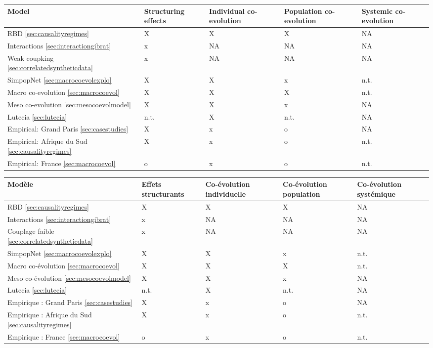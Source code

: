 \begin{table}
{\begin{tabular}[6pt]{|p{4cm}|p{2.5cm}|p{2.5cm}|p{2.5cm}|p{2.5cm}|}
\hline
Model & Structuring effects & Individual co-evolution & Population co-evolution & Systemic co-evolution \\\hline
RBD \ref{sec:causalityregimes} & X & X & X & NA \\\hline
Interactions \ref{sec:interactiongibrat} & x & NA & NA & NA \\\hline
Weak coupking \ref{sec:correlatedsyntheticdata} & x & NA & NA & NA \\\hline
SimpopNet \ref{sec:macrocoevolexplo} & X & X & x & n.t. \\\hline
Macro co-evolution \ref{sec:macrocoevol} & X & X & X & n.t. \\\hline
Meso co-evolution \ref{sec:mesocoevolmodel} & X & X & x & NA\\\hline
Lutecia \ref{sec:lutecia} & n.t. & X & n.t. & NA\\\hline
Empirical: Grand Paris \ref{sec:casestudies} & X & x & o & NA\\\hline
Empirical: Afrique du Sud \ref{sec:causalityregimes} & X & x & o & n.t.\\\hline
Empirical: France \ref{sec:macrocoevol} & o & x & o & n.t.\\\hline
\end{tabular}
}{
\begin{tabular}[6pt]{|p{4cm}|p{2.5cm}|p{2.5cm}|p{2.5cm}|p{2.5cm}|}
\hline
Modèle & Effets structurants & Co-évolution individuelle &  Co-évolution population & Co-évolution systémique \\\hline
RBD \ref{sec:causalityregimes} & X & X & X & NA \\\hline
Interactions \ref{sec:interactiongibrat} & x & NA & NA & NA \\\hline
Couplage faible \ref{sec:correlatedsyntheticdata} & x & NA & NA & NA \\\hline
SimpopNet \ref{sec:macrocoevolexplo} & X & X & x & n.t. \\\hline
Macro co-évolution \ref{sec:macrocoevol} & X & X & X & n.t. \\\hline
Meso co-évolution \ref{sec:mesocoevolmodel} & X & X & x & NA\\\hline
Lutecia \ref{sec:lutecia} & n.t. & X & n.t. & NA\\\hline
Empirique : Grand Paris \ref{sec:casestudies} & X & x & o & NA\\\hline
Empirique : Afrique du Sud \ref{sec:causalityregimes} & X & x & o & n.t.\\\hline
Empirique : France \ref{sec:macrocoevol} & o & x & o & n.t.\\\hline
\end{tabular}
}
\end{table}



